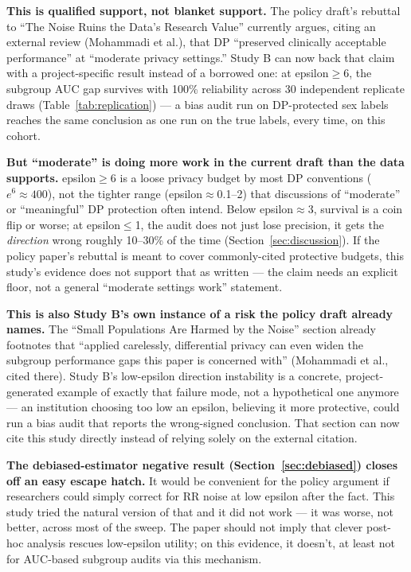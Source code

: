 \documentclass[11pt]{article}
\begin{document}
\textbf{This is qualified support, not blanket support.} The policy draft's rebuttal to ``The Noise Ruins the Data's Research Value'' currently argues, citing an external review (Mohammadi et al.), that DP ``preserved clinically acceptable performance'' at ``moderate privacy settings.'' Study B can now back that claim with a project-specific result instead of a borrowed one: at epsilon$\geq$6, the subgroup AUC gap survives with 100\% reliability across 30 independent replicate draws (Table~\ref{tab:replication}) --- a bias audit run on DP-protected sex labels reaches the same conclusion as one run on the true labels, every time, on this cohort.

\textbf{But ``moderate'' is doing more work in the current draft than the data supports.} epsilon$\geq$6 is a loose privacy budget by most DP conventions ($e^6 \approx 400$), not the tighter range (epsilon$\approx$0.1--2) that discussions of ``moderate'' or ``meaningful'' DP protection often intend. Below epsilon$\approx$3, survival is a coin flip or worse; at epsilon$\leq$1, the audit does not just lose precision, it gets the \emph{direction} wrong roughly 10--30\% of the time (Section~\ref{sec:discussion}). If the policy paper's rebuttal is meant to cover commonly-cited protective budgets, this study's evidence does not support that as written --- the claim needs an explicit floor, not a general ``moderate settings work'' statement.

\textbf{This is also Study B's own instance of a risk the policy draft already names.} The ``Small Populations Are Harmed by the Noise'' section already footnotes that ``applied carelessly, differential privacy can even widen the subgroup performance gaps this paper is concerned with'' (Mohammadi et al., cited there). Study B's low-epsilon direction instability is a concrete, project-generated example of exactly that failure mode, not a hypothetical one anymore --- an institution choosing too low an epsilon, believing it more protective, could run a bias audit that reports the wrong-signed conclusion. That section can now cite this study directly instead of relying solely on the external citation.

\textbf{The debiased-estimator negative result (Section~\ref{sec:debiased}) closes off an easy escape hatch.} It would be convenient for the policy argument if researchers could simply correct for RR noise at low epsilon after the fact. This study tried the natural version of that and it did not work --- it was worse, not better, across most of the sweep. The paper should not imply that clever post-hoc analysis rescues low-epsilon utility; on this evidence, it doesn't, at least not for AUC-based subgroup audits via this mechanism.
\end{document}
